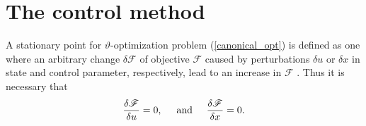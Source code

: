 
\section{The control method}

A stationary point for $\vartheta$-optimization problem (\ref{canonical_opt}) is defined as one where an arbitrary change $\delta \mathscr{F}$ of objective $\mathscr{F}$ caused by perturbations $\delta u$ or $\delta x$ in state and control parameter, respectively, lead to an increase in $\mathscr{F}$ \citep{bryson_1975}.  Thus it is necessary that 
\begin{align}
  \label{objective_perturbations}
  \frac{\delta \mathscr{F}}{\delta u} = 0, \hspace{5mm} \text{and} \hspace{5mm}
  \frac{\delta \mathscr{F}}{\delta x} = 0.
\end{align}

